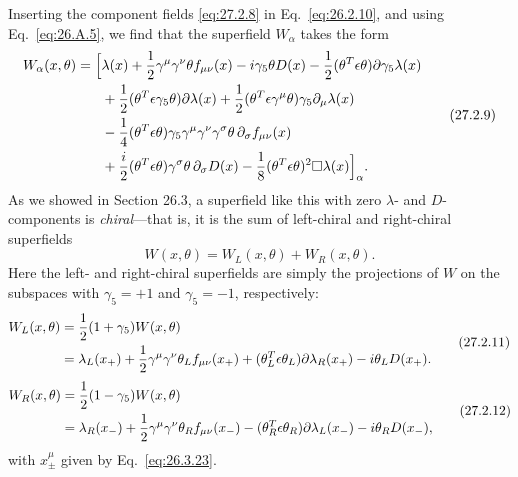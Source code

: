 Inserting the component fields \eqref{eq:27.2.8} in
Eq.~\eqref{eq:26.2.10}, and using Eq.~\eqref{eq:26.A.5}, we find that the
superfield \(W_\alpha\) takes the form
\begin{equation}
  \begin{aligned}
  W_\alpha(x,\theta)=\Bigl[&
    \lambda(x)
    +\frac12\gamma^\mu\gamma^\nu\theta f_{\mu\nu}(x)
    -i\gamma_5\theta D(x)
    -\frac12(\theta^T\epsilon\theta)
      \sl{\partial}\gamma_5\lambda(x)
  \\
  &+\frac12(\theta^T\epsilon\gamma_5\theta)
      \sl{\partial}\lambda(x)
    +\frac12(\theta^T\epsilon\gamma^\mu\theta)
      \gamma_5\partial_\mu\lambda(x)
  \\
  &-\frac14(\theta^T\epsilon\theta)
      \gamma_5\gamma^\mu\gamma^\nu\gamma^\sigma\theta\,
      \partial_\sigma f_{\mu\nu}(x)
  \\
  &+\frac{i}{2}(\theta^T\epsilon\theta)
      \gamma^\sigma\theta\,\partial_\sigma D(x)
    -\frac18(\theta^T\epsilon\theta)^2\Box\lambda(x)
  \Bigr]_\alpha.
  \end{aligned}
  \tag{27.2.9}\label{eq:27.2.9}
\end{equation}
As we showed in Section 26.3, a superfield like this with zero
\(\lambda\)- and \(D\)-components is \textit{chiral}---that is, it is the
sum of left-chiral and right-chiral superfields
\begin{equation}
  W(x,\theta)=W_L(x,\theta)+W_R(x,\theta).
  \tag{27.2.10}\label{eq:27.2.10}
\end{equation}
Here the left- and right-chiral superfields are simply the projections of
\(W\) on the subspaces with \(\gamma_5=+1\) and \(\gamma_5=-1\),
respectively:
\begin{equation}
  \begin{aligned}
  W_L(x,\theta)
  &=\frac12(1+\gamma_5)W(x,\theta)
  \\
  &=\lambda_L(x_+)
    +\frac12\gamma^\mu\gamma^\nu\theta_L f_{\mu\nu}(x_+)
    +(\theta_L^T\epsilon\theta_L)
      \sl{\partial}\lambda_R(x_+)
    -i\theta_LD(x_+).
  \end{aligned}
  \tag{27.2.11}\label{eq:27.2.11}
\end{equation}
\begin{equation}
  \begin{aligned}
  W_R(x,\theta)
  &=\frac12(1-\gamma_5)W(x,\theta)
  \\
  &=\lambda_R(x_-)
    +\frac12\gamma^\mu\gamma^\nu\theta_R f_{\mu\nu}(x_-)
    -(\theta_R^T\epsilon\theta_R)
      \sl{\partial}\lambda_L(x_-)
    -i\theta_RD(x_-),
  \end{aligned}
  \tag{27.2.12}\label{eq:27.2.12}
\end{equation}
with \(x_\pm^\mu\) given by Eq.~\eqref{eq:26.3.23}.

